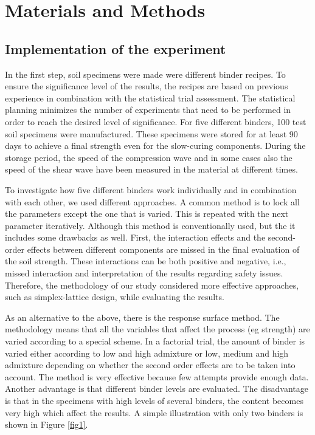 \documentclass[constrmater,article,submit,pdftex,moreauthors]{Definitions/mdpi}
\begin{document}
\section{Materials and Methods}

\subsection{Implementation of the experiment}

In the first step, soil specimens were made were different binder recipes. To ensure the significance level of the results, the recipes are based on previous experience in combination with the statistical trial assessment. The statistical planning minimizes the number of experiments that need to be performed in order to reach the desired level of significance. For five different binders, 100 test soil specimens were manufactured. These specimens were stored for at least 90 days to achieve a final strength even for the slow-curing components. During the storage period, the speed of the compression wave and in some cases also the speed of the shear wave have been measured in the material at different times. 

To investigate how five different binders work individually and in combination with each other, we used different approaches. A common method is to lock all the parameters except the one that is varied. This is repeated with the next parameter iteratively. Although this method is conventionally used, but the it includes some drawbacks as well. First, the interaction effects and the second-order effects between different components are missed in the final evaluation of the soil strength. These interactions can be both positive and negative, i.e., missed interaction and interpretation of the results regarding safety issues. Therefore, the methodology of our study considered more effective approaches, such as simplex-lattice design, while evaluating the results.

As an alternative to the above, there is the response surface method. The methodology means that all the variables that affect the process (eg strength) are varied according to a special scheme. In a factorial trial, the amount of binder is varied either according to low and high admixture or low, medium and high admixture depending on whether the second order effects are to be taken into account. The method is very effective because few attempts provide enough data. Another advantage is that different binder levels are evaluated. The disadvantage is that in the specimens with high levels of several binders, the content becomes very high which affect the results. A simple illustration with only two binders is shown in Figure \ref{fig1}.
\end{document}
